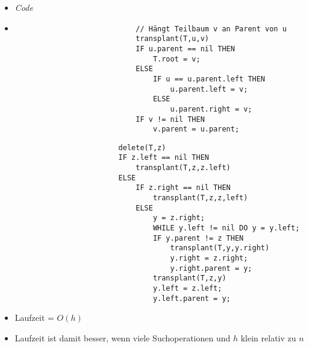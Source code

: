 \begin{itemize}
\begin{itemize}
                \item \textit{Code}
                \item[]
                    \begin{minipage}{0.45\textwidth}
                            \begin{verbatim}
                            // Hängt Teilbaum v an Parent von u
                            transplant(T,u,v) 
                            IF u.parent == nil THEN
                                T.root = v;
                            ELSE
                                IF u == u.parent.left THEN
                                    u.parent.left = v;
                                ELSE 
                                    u.parent.right = v;
                            IF v != nil THEN
                                v.parent = u.parent;
                            \end{verbatim}
                    \end{minipage}
                    \begin{minipage}{0.45\textwidth}
                        \begin{verbatim}
                        delete(T,z)
                        IF z.left == nil THEN
                            transplant(T,z,z.left)
                        ELSE
                            IF z.right == nil THEN
                                transplant(T,z,z,left)
                            ELSE
                                y = z.right;
                                WHILE y.left != nil DO y = y.left;
                                IF y.parent != z THEN
                                    transplant(T,y,y.right)
                                    y.right = z.right;
                                    y.right.parent = y;
                                transplant(T,z,y)
                                y.left = z.left;
                                y.left.parent = y;
                        \end{verbatim}
                    \end{minipage}
                \item Laufzeit = $O(h)$
                \item Laufzeit ist damit besser, wenn viele Suchoperationen und $h$ klein relativ zu $n$
            \end{itemize}


\end{itemize}
